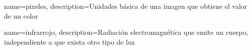 
 {
 name={pixeles},
 description={Unidades b\'asica de una imagen que obtiene el valor de un color}
 }
 
 {
 name={infrarrojo},
 description={Radiaci\'on electromagn\'etica que emite un cuerpo, independiente a que exista otro tipo de luz}
 }